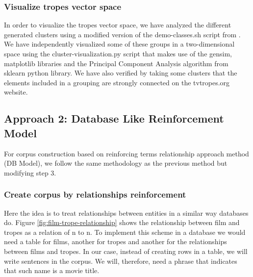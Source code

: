 \documentclass[letterpaper]{article}
\begin{document}
\subsubsection{Visualize tropes vector space}
In order to visualize the tropes vector space, we have analyzed the different generated clusters using a modified version of the demo-classes.sh script from \cite{git-hub-word2vec}. 
We have independently visualized some of these groups in a two-dimensional space using the cluster-visualization.py script that makes use of the gensim, matplotlib libraries and the Principal Component Analysis algorithm from sklearn python library. We have also verified by taking some clusters that the elements included in a grouping are strongly connected on the tvtropes.org website.

\subsection{Approach 2: Database Like Reinforcement Model}
For corpus construction based on reinforcing terms relationship approach method (DB Model), we follow the same methodology as the previous method but modifying step 3.
	
	
	
   \subsubsection{Create corpus by relationships reinforcement}

Here the idea is to treat relationships between entities in a similar way databases do. Figure \ref{fig:film-trope-relationship} shows the relationship between film and tropes as a relation of n to n. To implement this scheme in a database we would need a table for films, another for tropes and another for the relationships between films and tropes. In our case, instead of creating rows in a table, we will write sentences in the corpus. We will, therefore, need a phrase that indicates that such
name is a movie title.
\end{document}

